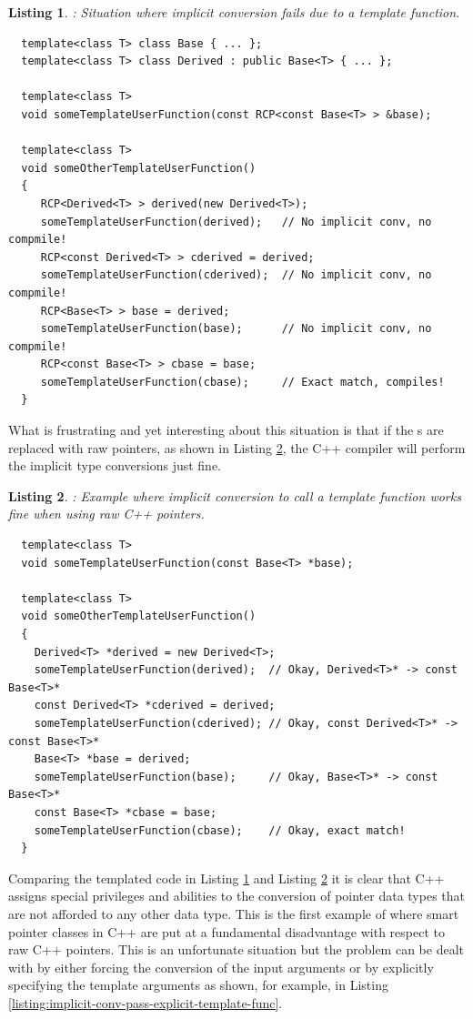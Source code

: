 \documentclass[pdf,ps2pdf,11pt]{SANDreport}
\newtheorem{listing}{Listing}
\begin{document}
{}\begin{listing}: Situation where implicit conversion fails due to a
template function.
\label{listing:implicit-conv-fail-template-func}
{\small\begin{verbatim}
  template<class T> class Base { ... };
  template<class T> class Derived : public Base<T> { ... };

  template<class T>
  void someTemplateUserFunction(const RCP<const Base<T> > &base);

  template<class T>
  void someOtherTemplateUserFunction()
  {
     RCP<Derived<T> > derived(new Derived<T>);
     someTemplateUserFunction(derived);   // No implicit conv, no compmile!
     RCP<const Derived<T> > cderived = derived;
     someTemplateUserFunction(cderived);  // No implicit conv, no compmile!
     RCP<Base<T> > base = derived;
     someTemplateUserFunction(base);      // No implicit conv, no compmile!
     RCP<const Base<T> > cbase = base;
     someTemplateUserFunction(cbase);     // Exact match, compiles!
  }
\end{verbatim}}
\end{listing}


What is frustrating and yet interesting about this situation is that
if the {}s are replaced with raw pointers, as shown in
Listing {}\ref{listing:implicit-conv-pass-raw--template-func}, the C++
compiler will perform the implicit type conversions just fine.


{}\begin{listing}: Example where implicit conversion to call a
template function works fine when using raw C++ pointers.
\label{listing:implicit-conv-pass-raw--template-func}
{\small\begin{verbatim}
  template<class T>
  void someTemplateUserFunction(const Base<T> *base);
  
  template<class T>
  void someOtherTemplateUserFunction()
  {
    Derived<T> *derived = new Derived<T>;
    someTemplateUserFunction(derived);  // Okay, Derived<T>* -> const Base<T>*
    const Derived<T> *cderived = derived;
    someTemplateUserFunction(cderived); // Okay, const Derived<T>* -> const Base<T>*
    Base<T> *base = derived;
    someTemplateUserFunction(base);     // Okay, Base<T>* -> const Base<T>*
    const Base<T> *cbase = base;
    someTemplateUserFunction(cbase);    // Okay, exact match!
  }
\end{verbatim}}
\end{listing}


Comparing the templated code in Listing
{}\ref{listing:implicit-conv-fail-template-func} and Listing
{}\ref{listing:implicit-conv-pass-raw--template-func} it is clear that
C++ assigns special privileges and abilities to the conversion of
pointer data types that are not afforded to any other data type.  This
is the first example of where smart pointer classes in C++ are put at
a fundamental disadvantage with respect to raw C++ pointers.  This is
an unfortunate situation but the problem can be dealt with by either
forcing the conversion of the input arguments or by explicitly
specifying the template arguments as shown, for example, in Listing
{}\ref{listing:implicit-conv-pass-explicit-template-func}.
\end{document}
